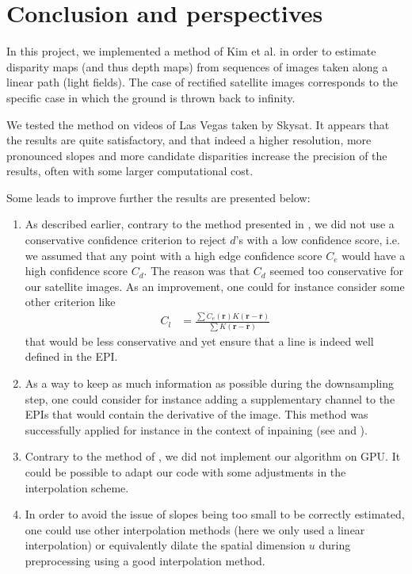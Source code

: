 \documentclass{article}
\theoremstyle{definition}
\begin{document}
\clearpage
\section{Conclusion and perspectives}


In this project, we implemented a method of Kim et al. in order to estimate disparity maps (and thus depth maps) from sequences of images taken along a linear path (light fields). The case of rectified satellite images corresponds to the specific case in which the ground is thrown back to infinity.


We tested the method on videos of Las Vegas taken by Skysat. It appears that the results are quite satisfactory, and that indeed a higher resolution, more pronounced slopes and more candidate disparities increase the precision of the results, often with some larger computational cost. 


Some leads to improve further the results are presented below:
\begin{enumerate}
 \item As described earlier, contrary to the method presented in \cite{art:kim13:lfields}, we did not use a conservative confidence criterion to reject $d$'s with a low confidence score, i.e. we assumed that any point with a high edge confidence score $C_e$ would have a high confidence score $C_d$. The reason was that $C_d$ seemed too conservative for our satellite images. As an improvement, one could for instance consider some other criterion like
 \begin{align}
  C_l &= \frac{\sum C_e(\mathbf{r}) K(\mathbf{r} - \overline{\mathbf{r}})}{\sum K(\mathbf{r} - \overline{\mathbf{r}})}
 \end{align}
 that would be less conservative and yet ensure that a line is indeed well defined in the EPI.
 \item As a way to keep as much information as possible during the downsampling step, one could consider for instance adding a supplementary channel to the EPIs that would contain the derivative of the image. This method was successfully applied for instance in the context of inpaining (see \cite{art:liu:deriv} and \cite{art:newson:deriv}).
 \item Contrary to the method of \cite{art:kim13:lfields}, we did not implement our algorithm on GPU. It could be possible to adapt our code with some adjustments in the interpolation scheme.
 \item In order to avoid the issue of slopes being too small to be correctly estimated, one could use other interpolation methods (here we only used a linear interpolation) or equivalently dilate the spatial dimension $u$ during preprocessing using a good interpolation method.
\end{enumerate}
\end{document}

